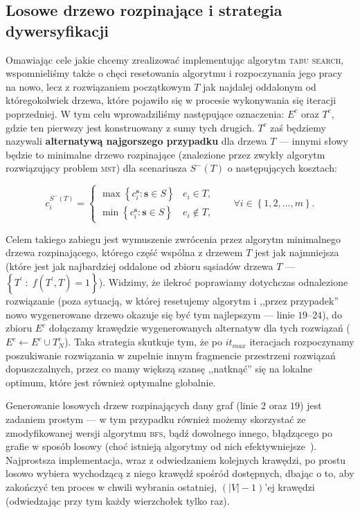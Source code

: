 \subsection{Losowe drzewo rozpinające i strategia dywersyfikacji}

Omawiając cele jakie chcemy zrealizować implementując algorytm \textsc{tabu search}, wspomnieliśmy także o chęci resetowania algorytmu i rozpoczynania jego pracy na nowo, lecz z rozwiązaniem początkowym $T$ jak najdalej oddalonym od któregokolwiek drzewa, które pojawiło się w procesie wykonywania się iteracji poprzedniej. W tym celu wprowadziliśmy następujące oznaczenia: $E^{c}$ oraz $T^{c}$, gdzie ten pierwszy jest konstruowany z sumy tych drugich. $T^{c}$ zaś będziemy nazywali \textbf{alternatywą najgorszego przypadku} dla drzewa $T$ --- innymi słowy będzie to minimalne drzewo rozpinające (znalezione przez zwykły algorytm rozwiązujący problem \textsc{mst}) dla scenariusza $S^{-} \left( T \right)$ o następujących kosztach:

\begin{equation}
	c^{S^{-} \left( T \right)}_{i} = \left\{\begin{matrix}
	\max \left\{ c^{\textbf{s}}_{i} : \textbf{s} \in S \right\} & e_{i} \in T\text{,}\\ 
	\min \left\{ c^{\textbf{s}}_{i} : \textbf{s} \in S \right\} & e_{i} \notin T\text{,}
	\end{matrix}\right. \qquad \forall i \in \left\{ 1, 2, \dots, m \right\}\text{.}
\end{equation}

Celem takiego zabiegu jest wymuszenie zwrócenia przez algorytm minimalnego drzewa rozpinającego, którego część wspólna z drzewem $T$ jest jak najmniejsza (które jest jak najbardziej oddalone od zbioru sąsiadów drzewa $T$ --- $\left\{ T^{\prime} \; : \; f \left( T^{\prime}, T \right) = 1 \right\}$). Widzimy, że ilekroć poprawiamy dotychczas odnalezione rozwiązanie (poza sytuacją, w której resetujemy algorytm i ,,przez przypadek'' nowo wygenerowane drzewo okazuje się być tym najlepszym --- linie $19$--$24$), do zbioru $E^{c}$ dołączamy krawędzie wygenerowanych alternatyw dla tych rozwiązań ($E^{c} \leftarrow E^{c} \cup T_{N}^{c}$). Taka strategia skutkuje tym, że po $it_{max}$ iteracjach rozpoczynamy poszukiwanie rozwiązania w zupełnie innym fragmencie przestrzeni rozwiązań dopuszczalnych, przez co mamy większą szansę ,,natknąć'' się na lokalne optimum, które jest również optymalne globalnie.

Generowanie losowych drzew rozpinających dany graf (linie $2$ oraz $19$) jest zadaniem prostym --- w tym przypadku również możemy skorzystać ze zmodyfikowanej wersji algorytmu \textsc{bfs}, bądź dowolnego innego, błądzącego po grafie w sposób losowy (choć istnieją algorytmy od nich efektywniejsze~\cite{Wilson:1996:GRS:237814.237880}). Najprostsza implementacja, wraz z odwiedzaniem kolejnych krawędzi, po prostu losowo wybiera wychodzącą z niego krawędź spośród dostępnych, dbając o to, aby zakończyć ten proces w chwili wybrania ostatniej, $\left( \left| V \right| - 1\right)$'ej krawędzi (odwiedzając przy tym każdy wierzchołek tylko raz).

